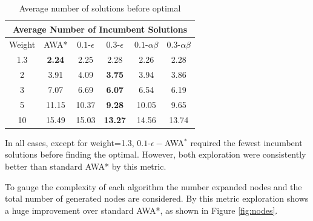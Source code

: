 \begin{table}
\begin{tabular}{ |c||c|c|c|c|c|  }
    \hline
    \multicolumn{6}{|c|}{Average Number of Incumbent Solutions} \\
    \hline
    Weight& AWA* & $0.1$-$\epsilon$ &$0.3$-$\epsilon$&$0.1$-$\alpha \beta$ & $0.3$-$\alpha \beta$\\
    \hline
    1.3 & \textbf{2.24} & 2.25 & 2.28 & 2.26 & 2.28\\
    2 & 3.91 & 4.09 & \textbf{3.75} & 3.94 & 3.86\\
    3 & 7.07 & 6.69 & \textbf{6.07} & 6.54 & 6.19\\
    5 & 11.15 & 10.37 & \textbf{9.28} & 10.05 & 9.65\\
    10& 15.49 & 15.03 & \textbf{13.27} & 14.56 & 13.74\\
    \hline
\end{tabular}
\caption{Average number of solutions before optimal}\label{tad:num-sol}
\end{table}

In all cases, except for weight=1.3, $0.1$-$\epsilon-$AWA$^*$ required the fewest incumbent solutions before finding the optimal. However, both exploration were consistently better than standard AWA* by this metric. 

To gauge the complexity of each algorithm the number expanded nodes and the total number of generated nodes are considered. By this metric exploration shows a huge improvement over standard AWA*, as shown in Figure \ref{fig:nodes}.

